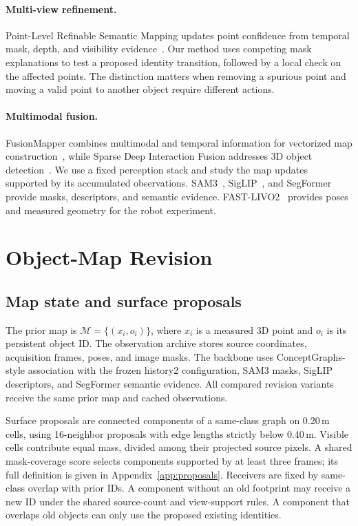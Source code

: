 \paragraph{Multi-view refinement.}
Point-Level Refinable Semantic Mapping updates point confidence from temporal mask, depth, and visibility evidence~\cite{refinable}. Our method uses competing mask explanations to test a proposed identity transition, followed by a local check on the affected points. The distinction matters when removing a spurious point and moving a valid point to another object require different actions.

\paragraph{Multimodal fusion.}
FusionMapper combines multimodal and temporal information for vectorized map construction~\cite{jie2025fusionmapper}, while Sparse Deep Interaction Fusion addresses 3D object detection~\cite{yan2025sparse}. We use a fixed perception stack and study the map updates supported by its accumulated observations. SAM3~\cite{sam3}, SigLIP~\cite{siglip}, and SegFormer~\cite{segformer} provide masks, descriptors, and semantic evidence. FAST-LIVO2~\cite{livo} provides poses and measured geometry for the robot experiment.

\section{Object-Map Revision}
\subsection{Map state and surface proposals}
The prior map is $\mathcal M=\{(x_i,o_i)\}$, where $x_i$ is a measured 3D point and $o_i$ is its persistent object ID. The observation archive stores source coordinates, acquisition frames, poses, and image masks. The backbone uses ConceptGraphs-style association with the frozen history2 configuration, SAM3 masks, SigLIP descriptors, and SegFormer semantic evidence. All compared revision variants receive the same prior map and cached observations.

Surface proposals are connected components of a same-class graph on 0.20\,m cells, using 16-neighbor proposals with edge lengths strictly below 0.40\,m. Visible cells contribute equal mass, divided among their projected source pixels. A shared mask-coverage score selects components supported by at least three frames; its full definition is given in Appendix~\ref{app:proposals}. Receivers are fixed by same-class overlap with prior IDs. A component without an old footprint may receive a new ID under the shared source-count and view-support rules. A component that overlaps old objects can only use the proposed existing identities.

